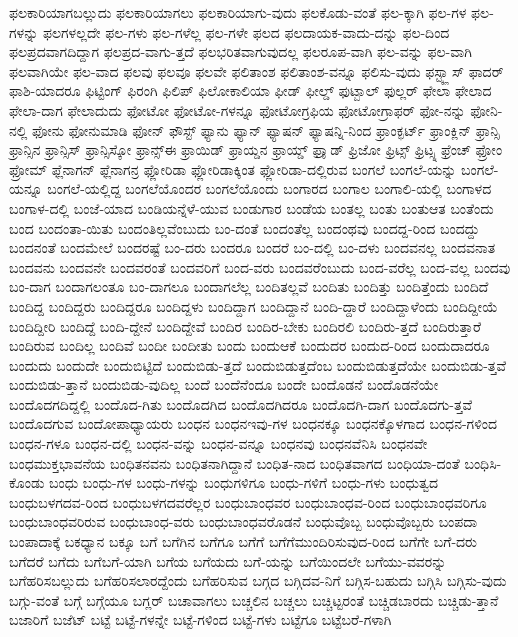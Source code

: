 {ಫಲಕಾರಿಯಾಗಬಲ್ಲುದು
ಫಲಕಾರಿಯಾಗಲು
ಫಲಕಾರಿಯಾಗು-ವುದು
ಫಲಕೊಡು-ವಂತೆ
ಫಲ-ಕ್ಕಾಗಿ
ಫಲ-ಗಳ
ಫಲ-ಗಳನ್ನು
ಫಲಗಳಲ್ಲದೇ
ಫಲ-ಗಳು
ಫಲ-ಗಳೆಲ್ಲ
ಫಲ-ಗಳೇ
ಫಲದ
ಫಲದಾಯಕ-ವಾದು-ದನ್ನು
ಫಲ-ದಿಂದ
ಫಲಪ್ರದವಾಗದಿದ್ದಾಗ
ಫಲಪ್ರದ-ವಾಗು-ತ್ತದೆ
ಫಲಭರಿತವಾಗುವುದಲ್ಲ
ಫಲರೂಪ-ವಾಗಿ
ಫಲ-ವನ್ನು
ಫಲ-ವಾಗಿ
ಫಲವಾಗಿಯೇ
ಫಲ-ವಾದ
ಫಲವು
ಫಲವೂ
ಫಲವೇ
ಫಲಿತಾಂಶ
ಫಲಿತಾಂಶ-ವನ್ನೂ
ಫಲಿಸು-ವುದು
ಫಸ್ಟ್ಕ್ಲಾಸ್
ಫಾದರ್
ಫಾಶಿ-ಯಾದರೂ
ಫಿಟ್ಟಿಂಗ್
ಫಿರಂಗಿ
ಫಿಲಿಪ್
ಫಿಲೋಕಾಲಿಯಾ
ಫೀಡ್
ಫೀಲ್ಡ್
ಫುಟ್ಬಾಲ್
ಫುಲ್ಲರ್
ಫೇಲಾ
ಫೇಲಾದ
ಫೇಲಾ-ದಾಗ
ಫೇಲಾದುದು
ಫೋಟೋ
ಫೋಟೋ-ಗಳನ್ನೂ
ಫೋಟೋಗ್ರಫಿಯ
ಫೋಟೋಗ್ರಾಫರ್
ಫೋ-ನನ್ನು
ಫೋನಿ-ನಲ್ಲಿ
ಫೋನು
ಫೋನುಮಾಡಿ
ಫೋನ್
ಫೌಸ್ಟ್
ಫ್ಯಾನು
ಫ್ಯಾನ್
ಫ್ಯಾಷನ್
ಫ್ಯಾಷನ್ನಿ-ನಿಂದ
ಫ್ರಾಂಕ್ಫರ್ಟ್
ಫ್ರಾಂಕ್ಲಿನ್
ಫ್ರಾನ್ಸಿ
ಫ್ರಾನ್ಸಿನ
ಫ್ರಾನ್ಸಿಸ್
ಫ್ರಾನ್ಸಿಸ್ಕೋ
ಫ್ರಾನ್ಸ್ಈ
ಫ್ರಾಯಿಡ್
ಫ್ರಾಯ್ಡನ
ಫ್ರಾಯ್ಡ್
ಫ್ರಾೖಡ್
ಫ್ರಿಜೋ
ಫ್ರಿಟ್ಸ್
ಫ್ರಿಟ್ಸ್ನ
ಫ್ರೆಂಚ್
ಫ್ರೋಂ
ಫ್ರೋಮ್
ಫ್ಲೆನಾಗನ್
ಫ್ಲೆನಾಗನ್ರ
ಫ್ಲೋರಿಡಾ
ಫ್ಲೋರಿಡಾಕ್ಕಿಂತ
ಫ್ಲೋರಿಡಾ-ದಲ್ಲಿರುವ
ಬಂಗಲೆ
ಬಂಗಲೆ-ಯನ್ನು
ಬಂಗಲೆ-ಯನ್ನೂ
ಬಂಗಲೆ-ಯಲ್ಲಿದ್ದ
ಬಂಗಲೆಯೊಂದರ
ಬಂಗಲೆಯೊಂದು
ಬಂಗಾರದ
ಬಂಗಾಲ
ಬಂಗಾಲಿ-ಯಲ್ಲಿ
ಬಂಗಾಳದ
ಬಂಗಾಳ-ದಲ್ಲಿ
ಬಂಜೆ-ಯಾದ
ಬಂಡಿಯನ್ನೆಳೆ-ಯುವ
ಬಂಡುಗಾರ
ಬಂಡೆಯ
ಬಂತಲ್ಲ
ಬಂತು
ಬಂತುಆತ
ಬಂತೆಂದು
ಬಂದ
ಬಂದಂತಾ-ಯಿತು
ಬಂದಂತಿಲ್ಲವೆಂಬುದು
ಬಂ-ದಂತೆ
ಬಂದಂತೆಲ್ಲ
ಬಂದಂಥವು
ಬಂದದ್ದ-ರಿಂದ
ಬಂದದ್ದು
ಬಂದನಂತೆ
ಬಂದಮೇಲೆ
ಬಂದರಷ್ಟೆ
ಬಂ-ದರು
ಬಂದರೂ
ಬಂದರೆ
ಬಂ-ದಲ್ಲಿ
ಬಂ-ದಳು
ಬಂದವನಲ್ಲ
ಬಂದವನಾತ
ಬಂದವನು
ಬಂದವನೇ
ಬಂದವರಂತೆ
ಬಂದವರಿಗೆ
ಬಂದ-ವರು
ಬಂದವರೆಂಬುದು
ಬಂದ-ವರೆಲ್ಲ
ಬಂದ-ವಲ್ಲ
ಬಂದವು
ಬಂ-ದಾಗ
ಬಂದಾಗಲಂತೂ
ಬಂ-ದಾಗಲೂ
ಬಂದಾಗಲೆಲ್ಲ
ಬಂದಿತಲ್ಲವೆ
ಬಂದಿತು
ಬಂದಿತ್ತು
ಬಂದಿತ್ತೆಂದು
ಬಂದಿದೆ
ಬಂದಿದ್ದ
ಬಂದಿದ್ದರು
ಬಂದಿದ್ದರೂ
ಬಂದಿದ್ದಳು
ಬಂದಿದ್ದಾಗ
ಬಂದಿದ್ದಾನೆ
ಬಂದಿ-ದ್ದಾರೆ
ಬಂದಿದ್ದಾಳೆಂದು
ಬಂದಿದ್ದೀಯೆ
ಬಂದಿದ್ದೀರಿ
ಬಂದಿದ್ದೆ
ಬಂದಿ-ದ್ದೇನೆ
ಬಂದಿದ್ದೇವೆ
ಬಂದಿರ
ಬಂದಿರ-ಬೇಕು
ಬಂದಿರಲಿ
ಬಂದಿರು-ತ್ತದೆ
ಬಂದಿರುತ್ತಾರೆ
ಬಂದಿರುವ
ಬಂದಿಲ್ಲ
ಬಂದಿವೆ
ಬಂದೀ
ಬಂದೀತು
ಬಂದು
ಬಂದುಆಕೆ
ಬಂದುದರ
ಬಂದುದ-ರಿಂದ
ಬಂದುದಾದರೂ
ಬಂದುದು
ಬಂದುದೇ
ಬಂದುಬಿಟ್ಟಿದೆ
ಬಂದುಬಿಡು-ತ್ತದೆ
ಬಂದುಬಿಡುತ್ತದೆಂಬ
ಬಂದುಬಿಡುತ್ತದೆಯೇ
ಬಂದುಬಿಡು-ತ್ತವೆ
ಬಂದುಬಿಡು-ತ್ತಾನೆ
ಬಂದುಬಿಡು-ವುದಿಲ್ಲ
ಬಂದೆ
ಬಂದೆನೆಂದೂ
ಬಂದೇ
ಬಂದೊಡನೆ
ಬಂದೊಡನೆಯೇ
ಬಂದೊದಗದಿದ್ದಲ್ಲಿ
ಬಂದೊದ-ಗಿತು
ಬಂದೊದಗಿದ
ಬಂದೊದಗಿದರೂ
ಬಂದೊದಗಿ-ದಾಗ
ಬಂದೊದಗು-ತ್ತವೆ
ಬಂದೊದಗುವ
ಬಂದೋಪಾಧ್ಯಾಯರು
ಬಂಧನ
ಬಂಧನಇವು-ಗಳ
ಬಂಧನಕ್ಕೂ
ಬಂಧನಕ್ಕೊಳಗಾದ
ಬಂಧನ-ಗಳಿಂದ
ಬಂಧನ-ಗಳೂ
ಬಂಧನ-ದಲ್ಲಿ
ಬಂಧನ-ವನ್ನು
ಬಂಧನ-ವನ್ನೂ
ಬಂಧನವು
ಬಂಧನವೆನಿಸಿ
ಬಂಧನವೇ
ಬಂಧಮುಕ್ತಭಾವನೆಯ
ಬಂಧಿತನವನು
ಬಂಧಿತನಾಗಿದ್ದಾನೆ
ಬಂಧಿತ-ನಾದ
ಬಂಧಿತವಾಗದ
ಬಂಧಿಯಾ-ದಂತೆ
ಬಂಧಿಸಿ-ಕೊಂಡು
ಬಂಧು
ಬಂಧು-ಗಳ
ಬಂಧು-ಗಳನ್ನು
ಬಂಧುಗಳಿಗೂ
ಬಂಧು-ಗಳಿಗೆ
ಬಂಧು-ಗಳು
ಬಂಧುತ್ವದ
ಬಂಧುಬಳಗದವ-ರಿಂದ
ಬಂಧುಬಳಗದವರೆಲ್ಲರ
ಬಂಧುಬಾಂಧವರ
ಬಂಧುಬಾಂಧವ-ರಿಂದ
ಬಂಧುಬಾಂಧವರಿಗೂ
ಬಂಧುಬಾಂಧವರಿರುವ
ಬಂಧುಬಾಂಧ-ವರು
ಬಂಧುಬಾಂಧವರೊಡನೆ
ಬಂಧುವೊಬ್ಬ
ಬಂಧುವೊಬ್ಬರು
ಬಂಪದಾ
ಬಂಪಾದಾಕ್ಕೆ
ಬಕಧ್ಯಾನ
ಬಕ್ಕೂ
ಬಗೆ
ಬಗೆಗಿನ
ಬಗೆಗೂ
ಬಗೆಗೆ
ಬಗೆಗೆಮುಂದಿರಿಸುವುದ-ರಿಂದ
ಬಗೆಗೇ
ಬಗೆ-ದರು
ಬಗೆದರೆ
ಬಗೆದು
ಬಗೆಬಗೆ-ಯಾಗಿ
ಬಗೆಯ
ಬಗೆಯದು
ಬಗೆ-ಯನ್ನು
ಬಗೆಯಿಂದಲೇ
ಬಗೆಯು-ವವರನ್ನು
ಬಗೆಹರಿಸಬಲ್ಲುದು
ಬಗೆಹರಿಸಲಾರದ್ದೆಂದು
ಬಗೆಹರಿಸುವ
ಬಗ್ಗದ
ಬಗ್ಗಿದವ-ನಿಗೆ
ಬಗ್ಗಿಸ-ಬಹುದು
ಬಗ್ಗಿಸಿ
ಬಗ್ಗಿಸು-ವುದು
ಬಗ್ಗು-ವಂತೆ
ಬಗ್ಗೆ
ಬಗ್ಗೆಯೂ
ಬಗ್ಲರ್
ಬಚಾವಾಗಲು
ಬಚ್ಚಲಿನ
ಬಚ್ಚಲು
ಬಚ್ಚಿಟ್ಟರಂತೆ
ಬಚ್ಚಿಡಬಾರದು
ಬಚ್ಚಿಡು-ತ್ತಾನೆ
ಬಜಾರಿಗೆ
ಬಜೆಟ್
ಬಟ್ಟೆ
ಬಟ್ಟೆ-ಗಳನ್ನೇ
ಬಟ್ಟೆ-ಗಳಿಂದ
ಬಟ್ಟೆ-ಗಳು
ಬಟ್ಟೆಗೂ
ಬಟ್ಟೆಬರೆ-ಗಳಾಗಿ
}
